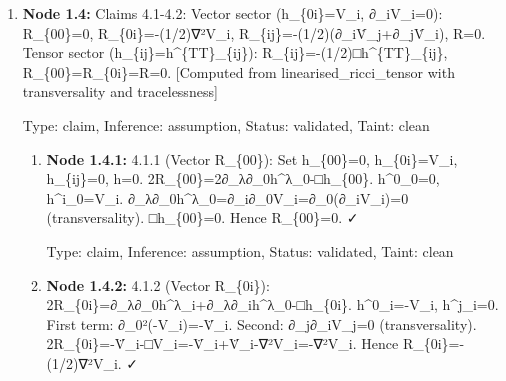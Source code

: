 \begin{enumerate}
\begin{enumerate}
  Type: claim, Inference: assumption, Status: validated, Taint: clean

\item \textbf{Node 1.3.3:} 3.1.3 (R\_\{ij\}): 2R\_\{ij\}=∂\_λ∂\_ih\textasciicircum{}λ\_j+∂\_λ∂\_jh\textasciicircum{}λ\_i-∂\_i∂\_jh-□h\_\{ij\}. ∂\_λ∂\_ih\textasciicircum{}λ\_j=∂\_k∂\_i(2ψδ\_\{kj\})=2∂\_i∂\_jψ, symmetrically for second term: total 4∂\_i∂\_jψ. ∂\_i∂\_jh=∂\_i∂\_j(-2Φ+6ψ), □h\_\{ij\}=2□ψδ\_\{ij\}. Combining: 2R\_\{ij\}=4∂\_i∂\_jψ+2∂\_i∂\_jΦ-6∂\_i∂\_jψ-2□ψδ\_\{ij\}=2∂\_i∂\_j(Φ-ψ)-2□ψδ\_\{ij\}. Hence R\_\{ij\}=∂\_i∂\_j(Φ-ψ)-□ψδ\_\{ij\}. ✓

  Type: claim, Inference: assumption, Status: validated, Taint: clean

\item \textbf{Node 1.3.4:} 3.1.4 (R\textasciicircum{}(1)): Using R\textasciicircum{}(1)=∂\_μ∂\_νh\textasciicircum{}\{μν\}-□h. ∂\_μ∂\_νh\textasciicircum{}\{μν\}=∂\_0²h\textasciicircum{}\{00\}+∂\_i∂\_jh\textasciicircum{}\{ij\}=2Φ̈+2∇²ψ. □h=(-∂\_t²+∇²)(-2Φ+6ψ)=2Φ̈-6ψ̈-2∇²Φ+6∇²ψ. Therefore R\textasciicircum{}(1)=2Φ̈+2∇²ψ-2Φ̈+6ψ̈+2∇²Φ-6∇²ψ=2∇²Φ-4∇²ψ+6ψ̈. ✓ QED.

  Type: claim, Inference: assumption, Status: validated, Taint: clean

\end{enumerate}
\item \textbf{Node 1.4:} Claims 4.1-4.2: Vector sector (h\_\{0i\}=V\_i, ∂\_iV\_i=0): R\_\{00\}=0, R\_\{0i\}=-(1/2)∇²V\_i, R\_\{ij\}=-(1/2)(∂\_iV̇\_j+∂\_jV̇\_i), R=0. Tensor sector (h\_\{ij\}=h\textasciicircum{}\{TT\}\_\{ij\}): R\_\{ij\}=-(1/2)□h\textasciicircum{}\{TT\}\_\{ij\}, R\_\{00\}=R\_\{0i\}=R=0. [Computed from linearised\_ricci\_tensor with transversality and tracelessness]

  Type: claim, Inference: assumption, Status: validated, Taint: clean

\begin{enumerate}
\item \textbf{Node 1.4.1:} 4.1.1 (Vector R\_\{00\}): Set h\_\{00\}=0, h\_\{0i\}=V\_i, h\_\{ij\}=0, h=0. 2R\_\{00\}=2∂\_λ∂\_0h\textasciicircum{}λ\_0-□h\_\{00\}. h\textasciicircum{}0\_0=0, h\textasciicircum{}i\_0=V\_i. ∂\_λ∂\_0h\textasciicircum{}λ\_0=∂\_i∂\_0V\_i=∂\_0(∂\_iV\_i)=0 (transversality). □h\_\{00\}=0. Hence R\_\{00\}=0. ✓

  Type: claim, Inference: assumption, Status: validated, Taint: clean

\item \textbf{Node 1.4.2:} 4.1.2 (Vector R\_\{0i\}): 2R\_\{0i\}=∂\_λ∂\_0h\textasciicircum{}λ\_i+∂\_λ∂\_ih\textasciicircum{}λ\_0-□h\_\{0i\}. h\textasciicircum{}0\_i=-V\_i, h\textasciicircum{}j\_i=0. First term: ∂\_0²(-V\_i)=-V̈\_i. Second: ∂\_j∂\_iV\_j=0 (transversality). 2R\_\{0i\}=-V̈\_i-□V\_i=-V̈\_i+V̈\_i-∇²V\_i=-∇²V\_i. Hence R\_\{0i\}=-(1/2)∇²V\_i. ✓


\end{enumerate}
\end{enumerate}
